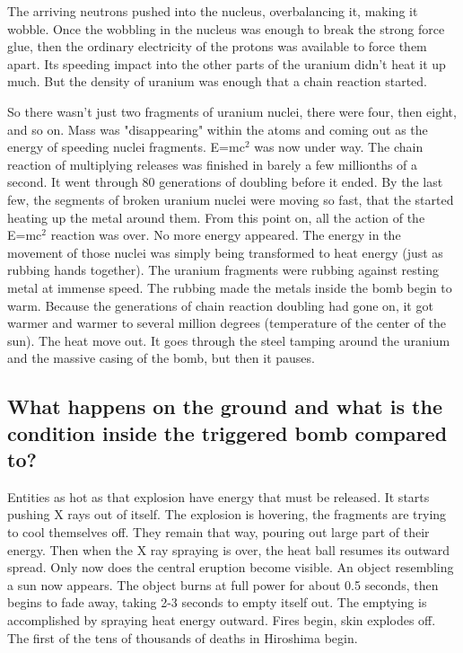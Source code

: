 The arriving neutrons pushed into the nucleus, overbalancing it, making it wobble. Once the wobbling in the nucleus was enough to break the strong force glue, then the ordinary electricity of the protons was available to force them apart. Its speeding impact into the other parts of the uranium didn't heat it up much. But the density of uranium was enough that a chain reaction started.

So there wasn't just two fragments of uranium nuclei, there were four, then eight, and so on. Mass was "disappearing" within the atoms and coming out as the energy of speeding nuclei fragments. E=mc$^2$ was now under way. The chain reaction of multiplying releases was finished in barely a few millionths of a second. It went through 80 generations of doubling before it ended. By the last few, the segments of broken uranium nuclei were moving so fast, that the started heating up the metal around them. From this point on, all the action of the E=mc$^2$ reaction was over. No more energy appeared. The energy in the movement of those nuclei was simply being transformed to heat energy (just as rubbing hands together). The uranium fragments were rubbing against resting metal at immense speed. The rubbing made the metals inside the bomb begin to warm. Because the generations of chain reaction doubling had gone on, it got warmer and warmer to several million degrees (temperature of the center of the sun). The heat move out. It goes through the steel tamping around the uranium and the massive casing of the bomb, but then it pauses.

\subsection*{What happens on the ground and what is the condition inside the triggered bomb compared to?}
Entities as hot as that explosion have energy that must be released. It starts pushing X rays out of itself. The explosion is hovering, the fragments are trying to cool themselves off. They remain that way, pouring out large part of their energy. Then when the X ray spraying is over, the heat ball resumes its outward spread. Only now does the central eruption become visible. An object resembling a sun now appears. The object burns at full power for about 0.5 seconds, then begins to fade away, taking 2-3 seconds to empty itself out. The emptying is accomplished by spraying heat energy outward. Fires begin, skin explodes off. The first of the tens of thousands of deaths in Hiroshima begin. 

